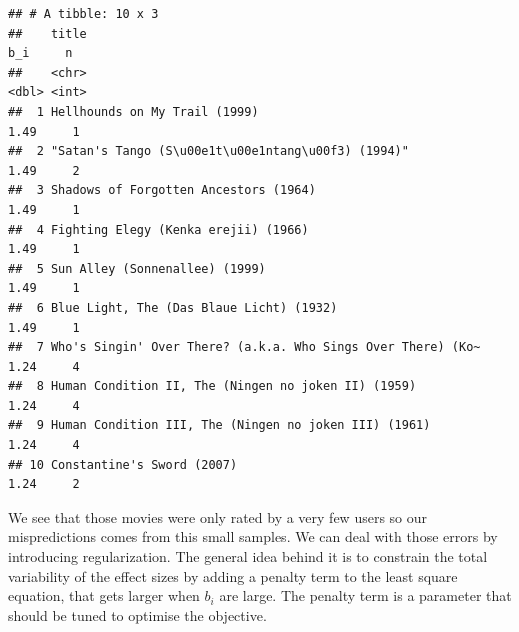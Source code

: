 \documentclass[]{article}
\begin{document}
\begin{verbatim}
## # A tibble: 10 x 3
##    title                                                          b_i     n
##    <chr>                                                        <dbl> <int>
##  1 Hellhounds on My Trail (1999)                                 1.49     1
##  2 "Satan's Tango (S\u00e1t\u00e1ntang\u00f3) (1994)"            1.49     2
##  3 Shadows of Forgotten Ancestors (1964)                         1.49     1
##  4 Fighting Elegy (Kenka erejii) (1966)                          1.49     1
##  5 Sun Alley (Sonnenallee) (1999)                                1.49     1
##  6 Blue Light, The (Das Blaue Licht) (1932)                      1.49     1
##  7 Who's Singin' Over There? (a.k.a. Who Sings Over There) (Ko~  1.24     4
##  8 Human Condition II, The (Ningen no joken II) (1959)           1.24     4
##  9 Human Condition III, The (Ningen no joken III) (1961)         1.24     4
## 10 Constantine's Sword (2007)                                    1.24     2
\end{verbatim}

We see that those movies were only rated by a very few users so our
mispredictions comes from this small samples. We can deal with those
errors by introducing regularization. The general idea behind it is to
constrain the total variability of the effect sizes by adding a penalty
term to the least square equation, that gets larger when \(b_i\) are
large. The penalty term is a parameter that should be tuned to optimise
the objective.
\end{document}
